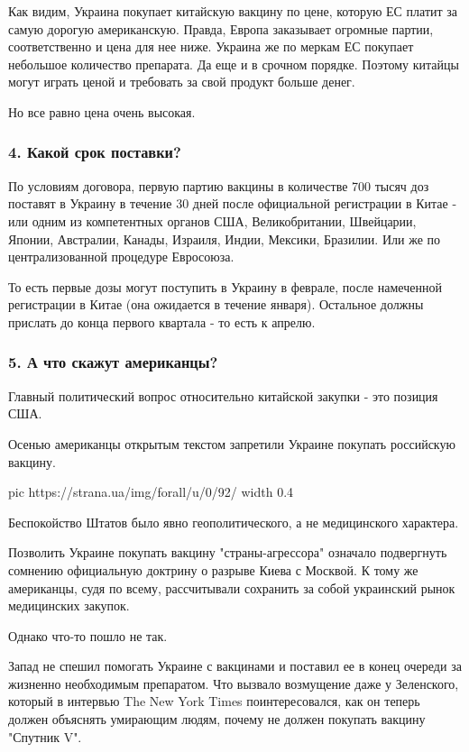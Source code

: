 Как видим, Украина покупает китайскую вакцину по цене, которую ЕС платит за
самую дорогую американскую. Правда, Европа заказывает огромные партии,
соответственно и цена для нее ниже. Украина же по меркам ЕС покупает небольшое
количество препарата. Да еще и в срочном порядке. Поэтому китайцы могут играть
ценой и требовать за свой продукт больше денег. 

Но все равно цена очень высокая.

\subsubsection{4. Какой срок поставки?}

По условиям договора, первую партию вакцины в количестве 700 тысяч доз поставят
в Украину в течение 30 дней после официальной регистрации в Китае -
или одним из компетентных органов США, Великобритании, Швейцарии, Японии,
Австралии, Канады, Израиля, Индии, Мексики, Бразилии. Или же по
централизованной процедуре Евросоюза.

То есть первые дозы могут поступить в Украину в феврале, после намеченной
регистрации в Китае (она ожидается в течение января). Остальное должны прислать
до конца первого квартала - то есть к апрелю. 

\subsubsection{5. А что скажут американцы?}

Главный политический вопрос относительно китайской закупки - это позиция США. 

Осенью американцы открытым текстом запретили Украине покупать российскую
вакцину.

\ifcmt
  pic https://strana.ua/img/forall/u/0/92/%
  width 0.4
\fi

Беспокойство Штатов было явно геополитического, а не медицинского характера.

Позволить Украине покупать вакцину "страны-агрессора" означало подвергнуть
сомнению официальную доктрину о разрыве Киева с Москвой. К тому же американцы,
судя по всему, рассчитывали сохранить за собой украинский рынок медицинских
закупок. 

Однако что-то пошло не так.

Запад не спешил помогать Украине с вакцинами и поставил ее в конец очереди за
жизненно необходимым препаратом. Что вызвало возмущение даже у Зеленского,
который в интервью The New York Times поинтересовался, как он теперь должен
объяснять умирающим людям, почему не должен покупать вакцину "Спутник V".

